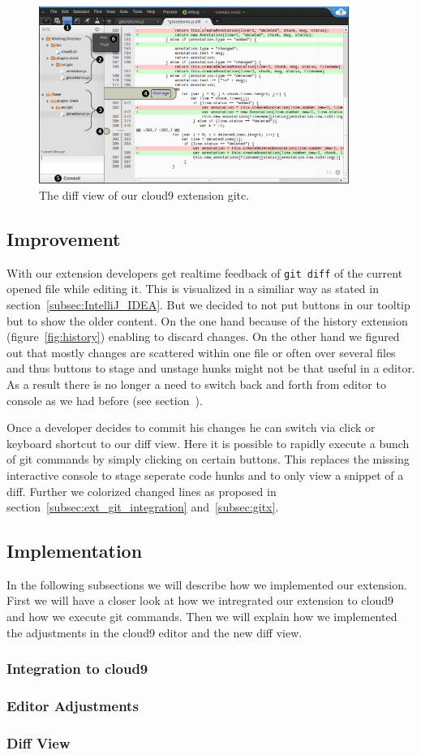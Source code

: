 \begin{figure}
   \centering
   \includegraphics[width=0.9\textwidth]{images/extension_unstage.png}
   \caption{The diff view of our cloud9 extension gitc.}
   \label{fig:diff_view}
\end{figure}

\subsection{Improvement}
With our extension developers get realtime feedback of \texttt{git diff} of the current opened file while editing it.
This is visualized in a similiar way as stated in section~\ref{subsec:IntelliJ_IDEA}.
But we decided to not put buttons in our tooltip but to show the older content.
On the one hand because of the history extension (figure~\ref{fig:history}) enabling to discard changes.
On the other hand we figured out that mostly changes are scattered within one file or often over several files and thus buttons to stage and unstage hunks might not be that useful in a editor.
As a result there is no longer a need to switch back and forth from editor to console as we had before (see section~).

Once a developer decides to commit his changes he can switch via click or keyboard shortcut to our diff view.
Here it is possible to rapidly execute a bunch of git commands by simply clicking on certain buttons.
This replaces the missing interactive console to stage seperate code hunks and to only view a snippet of a diff.
Further we colorized changed lines as proposed in section~\ref{subsec:ext_git_integration} and~\ref{subsec:gitx}.


\subsection{Implementation}
In the following subsections we will describe how we implemented our extension.
First we will have a closer look at how we intregrated our extension to cloud9 and how we execute git commands.
Then we will explain how we implemented the adjustments in the cloud9 editor and the new diff view.

\subsubsection{Integration to cloud9}

\subsubsection{Editor Adjustments}

\subsubsection{Diff View}

